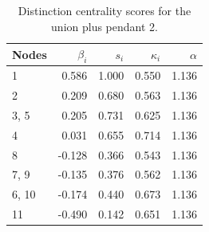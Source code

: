 \begin{table}
\centering
\caption{\label{tab:unionpendant2}Distinction centrality scores for the union plus pendant 2.}
\centering
\begin{tabular}[t]{lrrrr}
\toprule
Nodes & $\beta_i$ & $s_i$ & $\kappa_i$ & $\alpha$\\
\midrule
1 & 0.586 & 1.000 & 0.550 & 1.136\\
2 & 0.209 & 0.680 & 0.563 & 1.136\\
3, 5 & 0.205 & 0.731 & 0.625 & 1.136\\
4 & 0.031 & 0.655 & 0.714 & 1.136\\
8 & -0.128 & 0.366 & 0.543 & 1.136\\
7, 9 & -0.135 & 0.376 & 0.562 & 1.136\\
6, 10 & -0.174 & 0.440 & 0.673 & 1.136\\
11 & -0.490 & 0.142 & 0.651 & 1.136\\
\bottomrule
\end{tabular}
\end{table}
